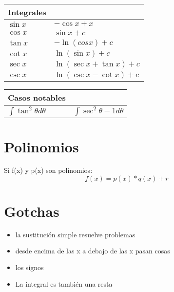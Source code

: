 \documentclass[11pt]{article}
\begin{document}
\begin{center}
\begin{tabular}{ll}
Integrales & \\
\hline
$\sin x$ & $- \cos x + x$\\
$\cos x$ & $\sin x + c$\\
$\tan x$ & $-\ln(cos x) + c$\\
$\cot x$ & $\ln(\sin x) + c$\\
$\sec x$ & $\ln(\sec x + \tan x) + c$\\
$\csc x$ & $\ln(\csc x - \cot x) + c$\\
\end{tabular}
\end{center}


\begin{center}
\begin{tabular}{ll}
Casos notables & \\
\hline
$\int \tan^2 \theta d\theta$ & $\int \sec^2 \theta - 1 d\theta$\\
\end{tabular}
\end{center}


\section{Polinomios}
\label{sec-5}
Si f(x) y p(x) son polinomios:
\[ f(x) = p(x) * q(x) + r \]

\section{Gotchas}
\label{sec-6}
\begin{itemize}
\item la sustitución simple resuelve problemas
\item desde encima de las x a debajo de las x pasan cosas
\item los signos
\item La integral es también una resta
\end{itemize}
\end{document}
